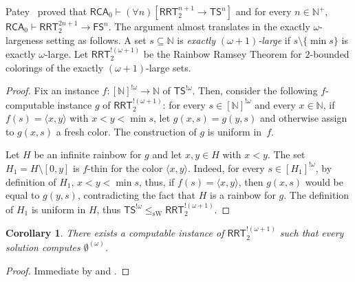 \documentclass{article}
\newcommand{\RCA}[0]{\mathsf{RCA}}
\newcommand{\RRT}[0]{\mathsf{RRT}}
\newcommand{\FS}[0]{\mathsf{FS}}
\newcommand{\TS}[0]{\mathsf{TS}}
\newcommand{\NN}[0]{\mathbb{N}}
\newcommand{\sW}{\mathrm{sW}}
\numberwithin{theorem}{section}
\newtheorem{proposition}[theorem]{Proposition}
\newtheorem{corollary}[theorem]{Corollary}
\newcommand{\ludovic}[1]{\textcolor{blue}{#1}}
\newcommand{\lorenzo}[1]{\textcolor{orange}{#1}}
\begin{document}

Patey~\cite{patey2015somewhere} proved that $\RCA_0 \vdash (\forall n)[\RRT^{n+1}_2 \to \TS^n]$ and for every $n \in \NN^+$, $\RCA_0 \vdash \RRT^{2n+1}_2 \to \FS^n$. The argument almost translates in the exactly $\omega$-largeness setting as follows. A set $s\subseteq\NN$ is \emph{exactly $(\omega+1)$-large} if $s \setminus \{\min s\}$ is exactly $\omega$-large. Let $\RRT^{!(\omega+1)}_2$ be the Rainbow Ramsey Theorem for $2$-bounded colorings of the exactly $(\omega+1)$-large sets.

\begin{proof}
Fix an instance $f : [\NN]^{!\omega} \to \NN$ of $\TS^{!\omega}$. Then, consider the following $f$-computable instance $g$ of $\RRT^{!(\omega + 1)}_2$: for every $s \in [\NN]^{!\omega}$ and every $x \in \NN$, if $f(s) = \langle x,y \rangle$ with $x < y < \min s$, let $g(x,s) = g(y,s)$ and otherwise assign to $g(x,s)$ a fresh color. The construction of $g$ is uniform in~$f$.

Let $H$ be an infinite rainbow for $g$ and let $x,y \in H$ with $x < y$. The set $H_1 = H \setminus [0,y]$ is $f$-thin for the color $\langle x,y \rangle$. Indeed, for every $s \in [H_1]^{!\omega}$, by definition of $H_1$, $x < y < \min s$, thus, if $f(s) = \langle x, y \rangle$, then $g(x,s)$ would be equal to $g(y,s)$, contradicting the fact that $H$ is a rainbow for $g$. The definition of $H_1$ is uniform in $H$, thus $\TS^{!\omega} \leq_{\sW} \RRT^{!(\omega+1)}_2$.
\end{proof}

\begin{corollary}
There exists a computable instance of $\RRT^{!(\omega+1)}_2$ such that every solution computes $\emptyset^{(\omega)}$.
\end{corollary}
\begin{proof}
Immediate by  and .
\end{proof}
\end{document}
